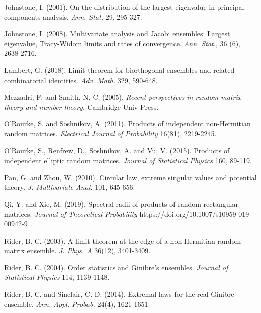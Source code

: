 \documentclass[11pt]{article}
\numberwithin{equation}{section}
\begin{document}
\begin{thebibliography}{AA}
Johnstone, I. (2001). On the distribution of the largest eigenvalue
in principal components analysis. {\it Ann. Stat.} 29, 295-327.

Johnstone, I. (2008). Multivariate analysis and Jacobi ensembles:
Largest eigenvalue, Tracy-Widom limits and rates of convergence.
{\it Ann. Stat.}, 36 (6), 2638-2716.



Lambert, G. (2018). Limit theorem for biorthogonal ensembles and
related combinatorial identities. {\it Adv. Math.} 329, 590-648.



 Mezzadri, F. and Snaith, N. C. (2005). {\it Recent perspectives in random matrix theory and number theory}.
Cambridge Univ Press.


O'Rourke, S. and Soshnikov, A.  (2011). Products of independent
non-Hermitian random matrices. {\it Electrical Journal of
Probability} 16(81), 2219-2245.

O'Rourke, S., Renfrew, D., Soshnikov, A. and Vu, V.  (2015).
Products of independent elliptic random matrices. {\it Journal of
Statistical Physics} 160, 89-119.


Pan, G. and  Zhou, W. (2010).
 Circular law, extreme singular values and potential theory. {\it J. Multivariate Anal.} 101,
 645-656.


Qi, Y. and Xie, M. (2019).  Spectral radii of products of random
rectangular matrices.  {\it Journal of Theoretical Probability}
https://doi.org/10.1007/s10959-019-00942-9





Rider, B. C. (2003). A limit theorem at the edge of a non-Hermitian
random matrix ensemble. {\it J. Phys. A}  36(12), 3401-3409.

Rider, B. C. (2004). Order statistics and Ginibre’s ensembles.
{\it Journal of Statistical Physics} 114, 1139-1148.


Rider, B. C. and Sinclair, C. D. (2014). Extremal laws for the real
Ginibre ensemble. {\it Ann. Appl. Probab.} 24(4), 1621-1651.



\end{thebibliography}
\end{document}

